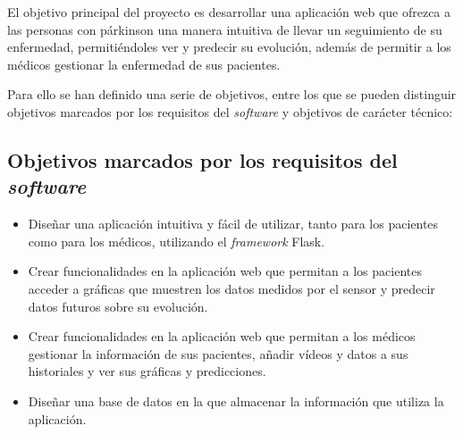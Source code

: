 
El objetivo principal del proyecto es desarrollar una aplicación web que ofrezca a las personas con párkinson una manera intuitiva de llevar un seguimiento de su enfermedad, permitiéndoles ver y predecir su evolución, además de permitir a los médicos gestionar la enfermedad de sus pacientes.

Para ello se han definido una serie de objetivos, entre los que se pueden distinguir objetivos marcados por los requisitos del \textit{software} y objetivos de carácter técnico:


\subsection{Objetivos marcados por los requisitos del \textit{software}}
\begin{itemize}
    \item Diseñar una aplicación intuitiva y fácil de utilizar, tanto para los pacientes como para los médicos, utilizando el \textit{framework} Flask.
    \item Crear funcionalidades en la aplicación web que permitan a los pacientes acceder a gráficas que muestren los datos medidos por el sensor y predecir datos futuros sobre su evolución.
    \item Crear funcionalidades en la aplicación web que permitan a los médicos gestionar la información de sus pacientes, añadir vídeos y datos a sus historiales y ver sus gráficas y predicciones.
    \item Diseñar una base de datos en la que almacenar la información que utiliza la aplicación.
\end{itemize}


